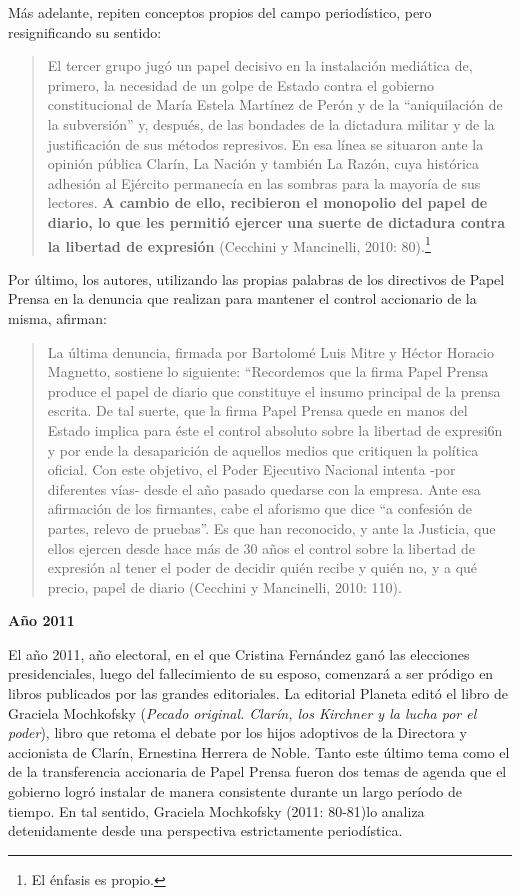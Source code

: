 Más adelante, repiten conceptos propios del campo periodístico, pero resignificando su sentido:

\begin{quote}
El tercer grupo  jugó un papel decisivo en la instalación mediática de, primero, la necesidad de un golpe de Estado contra el gobierno constitucional de María Estela Martínez de Perón y de la ``aniquilación de la subversión'' y, después, de las bondades de la dictadura militar y de la justificación de sus métodos represivos. En esa línea se situaron  ante la opinión pública Clarín, La Nación y también La Razón, cuya histórica adhesión al Ejército permanecía en las sombras para la mayoría de sus lectores. \textbf{A cambio de ello, recibieron el monopolio del papel de diario, lo que les permitió ejercer}  \textbf{una suerte de dictadura contra la libertad de expresión} (Cecchini y Mancinelli, 2010: 80).\footnote{El énfasis es propio.}
\end{quote}

Por último, los autores, utilizando las propias palabras de los directivos de Papel Prensa en la denuncia que realizan para mantener el control accionario de la misma, afirman:

\begin{quote}
La última denuncia, firmada por Bartolomé Luis Mitre y Héctor Horacio Magnetto, sostiene lo siguiente: ``Recordemos que la firma Papel Prensa produce el papel de diario que constituye el insumo principal de la prensa escrita. De tal suerte, que la firma Papel Prensa quede en manos del Estado implica para éste el control absoluto sobre la libertad de expresi6n y por ende la desaparición de aquellos medios que critiquen la política oficial. Con este objetivo, el Poder Ejecutivo Nacional intenta -por diferentes vías- desde el año pasado quedarse con la empresa. Ante esa afirmación de los firmantes, cabe el aforismo que dice ``a confesión de partes, relevo de pruebas''. Es que han reconocido, y ante la Justicia, que ellos ejercen desde hace más de 30 años el control sobre la libertad de expresión al tener el poder de decidir quién recibe y quién no, y a qué precio, papel de diario (Cecchini y Mancinelli, 2010: 110).
\end{quote}

\textbf{Año 2011}

El año 2011, año electoral, en el que Cristina Fernández ganó las elecciones presidenciales, luego del fallecimiento de su esposo, comenzará a ser pródigo en libros publicados por las grandes editoriales. La editorial Planeta editó el libro de Graciela Mochkofsky (\emph{Pecado original. Clarín, los Kirchner y la lucha por el poder}), libro que retoma el debate por los hijos adoptivos de la Directora y accionista de Clarín, Ernestina Herrera de Noble. Tanto este último tema como el de la transferencia accionaria de Papel Prensa fueron dos temas de agenda que el gobierno logró instalar de manera consistente durante un largo período de tiempo. En tal sentido, Graciela Mochkofsky (2011: 80-81)lo analiza detenidamente desde una perspectiva estrictamente periodística.

